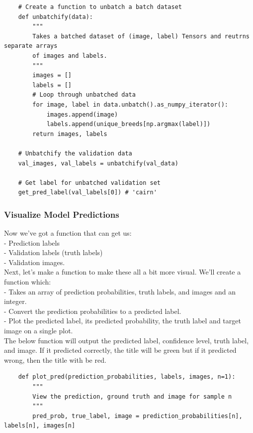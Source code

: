 \documentclass[11pt, a4paper]{article}
\begin{document}
\begin{spacing}{1.1}
\begin{lstlisting}
	# Create a function to unbatch a batch dataset
	def unbatchify(data):
		"""
		Takes a batched dataset of (image, label) Tensors and reutrns separate arrays
		of images and labels.
		"""
		images = []
		labels = []
		# Loop through unbatched data
		for image, label in data.unbatch().as_numpy_iterator():
			images.append(image)
			labels.append(unique_breeds[np.argmax(label)])
		return images, labels
	
	# Unbatchify the validation data
	val_images, val_labels = unbatchify(val_data)
	
	# Get label for unbatched validation set
	get_pred_label(val_labels[0]) # 'cairn'	\end{lstlisting} \vspace*{1mm}
	\subsubsection{Visualize Model Predictions}
	Now we've got a function that can get us: \\
	\hspace*{3mm} - Prediction labels\\
	\hspace*{3mm} - Validation labels (truth labels) \\
	\hspace*{3mm} - Validation images. \vspace*{1mm} \\
	Next, let's make a function to make these all a bit more visual. We'll create a function which: \\
	\hspace*{2mm} - Takes an array of prediction probabilities, truth labels, and images and an integer. \\
	\hspace*{2mm} - Convert the prediction probabilities to a predicted label. \\
	\hspace*{2mm} - Plot the predicted label, its predicted probability, the truth label and target image on a single plot.\vspace*{1mm} \\
	The below function will output the predicted label, confidence level, truth label, and image. If it predicted correctly, the title will be green but if it predicted wrong, then the title with be red. \newpage

	\begin{lstlisting}
	def plot_pred(prediction_probabilities, labels, images, n=1):
		"""
		View the prediction, ground truth and image for sample n
		"""
		pred_prob, true_label, image = prediction_probabilities[n], labels[n], images[n]
		

\end{lstlisting}
\end{spacing}
\end{document}
